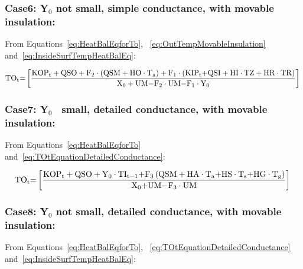 \subsubsection{Case6: Y\(_{0}\) not small, simple conductance, with movable insulation:}\label{case6-yux5f0-not-small-simple-conductance-with-movable-insulation}

From Equations~\ref{eq:HeatBalEqforTo}, ~\ref{eq:OutTempMovableInsulation} and~\ref{eq:InsideSurfTempHeatBalEq}:

\begin{equation}
{\rm{T}}{{\rm{O}}_{\rm{t}}}{\rm{ = }}\left[ {\frac{{{\rm{KO}}{{\rm{P}}_{\rm{t}}} + {\rm{QSO}} + {{\rm{F}}_2}\cdot \left( {{\rm{QSM + HO}}\cdot {{\rm{T}}_{\rm{a}}}} \right) + {{\rm{F}}_1}\cdot \left( {{\rm{KI}}{{\rm{P}}_{\rm{t}}}{\rm{ + QSI + HI}}\cdot {\rm{TZ + HR}}\cdot {\rm{TR}}} \right)}}{{{{\rm{X}}_{\rm{0}}} + {\rm{UM - }}{{\rm{F}}_{\rm{2}}}\cdot {\rm{UM - }}{{\rm{F}}_{\rm{1}}}\cdot {{\rm{Y}}_{\rm{0}}}}}} \right]{\rm{  }}
\label{eq:HeatBalanceEquationCase6}
\end{equation}

\subsubsection{Case7: Y\(_{0}\)~ small, detailed conductance, with movable insulation:}\label{case7-yux5f0-small-detailed-conductance-with-movable-insulation}

From Equations~\ref{eq:HeatBalEqforTo} and~\ref{eq:TOtEquationDetailedConductance}:

\begin{equation}
{\rm{T}}{{\rm{O}}_{\rm{t}}}{\rm{ = }}\left[ {\frac{{{\rm{KO}}{{\rm{P}}_{\rm{t}}} + {\rm{QSO}} + {{\rm{Y}}_0}\cdot {\rm{T}}{{\rm{I}}_{{\rm{t - 1}}}}{\rm{ + }}{{\rm{F}}_{\rm{3}}}\left( {{\rm{QSM + HA}}\cdot {{\rm{T}}_{\rm{a}}}{\rm{ + HS}}\cdot {{\rm{T}}_{\rm{s}}}{\rm{ + HG}}\cdot {{\rm{T}}_{\rm{g}}}} \right)}}{{{{\rm{X}}_{\rm{0}}}{\rm{ + UM - }}{{\rm{F}}_{\rm{3}}}\cdot {\rm{UM}}}}} \right]{\rm{  }}
\label{eq:HeatBalanceEquationCase7}
\end{equation}

\subsubsection{Case8: Y\(_{0}\) not small, detailed conductance, with movable insulation:}\label{case8-yux5f0-not-small-detailed-conductance-with-movable-insulation}

From Equations~\ref{eq:HeatBalEqforTo}, ~\ref{eq:TOtEquationDetailedConductance} and~\ref{eq:InsideSurfTempHeatBalEq}:

